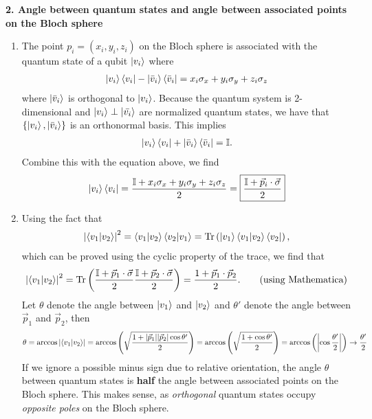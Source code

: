 \documentclass{article}
\theoremstyle{definition}
\newcommand{\f}[2]{\frac{#1}{#2}}
\newcommand{\lp}{\left(}
\newcommand{\rp}{\right)}
\begin{document}
\noindent \textbf{2. Angle between quantum states and angle between associated points on the Bloch sphere} 

\begin{enumerate}[label=(\alph*)]
	\item The point $p_i = (x_i,y_i,z_i)$ on the Bloch sphere is associated with the quantum state of a qubit $\ket{v_i}$ where
	\begin{align*}
		\ket{v_i}\bra{v_i} - \ket{\bar{v}_i} \bra{\bar{v}_i} = x_i \sigma_x + y_i \sigma_y + z_i \sigma_z
	\end{align*}
	where $\ket{\bar{v}_i}$ is orthogonal to $\ket{v_i}$. Because the quantum system is 2-dimensional and $\ket{v_i}\perp \ket{\bar{v_i}}$ are normalized quantum states, we have that $\{ \ket{v_i}, \ket{\bar{v}_i} \}$ is an orthonormal basis. This implies
	\begin{align*}
		\ket{v_i}\bra{v_i} + \ket{\bar{v}_i}\bra{\bar{v}_i} = \mathbb{I}.
	\end{align*}
	Combine this with the equation above, we find
	\begin{align*}
		\ket{v_i} \bra{v_i} = \f{\mathbb{I} + x_i \sigma_x + y_i \sigma_y + z_i \sigma_z }{2} = \boxed{\f{\mathbb{I} + \vec{p}_i\cdot \vec{\sigma}}{2}}
	\end{align*}



	\item Using the fact that
	\begin{align*}
		\abs{\bra{v_1}\ket{v_2}}^2 = \bra{v_1}\ket{v_2} \bra{v_2}\ket{v_1} = \Tr\lp \ket{v_1} \bra{v_1}   \ket{v_2} \bra{v_2}  \rp,
	\end{align*}
	which can be proved using the cyclic property of the trace, we find that
	\begin{align*}
			\abs{\bra{v_1}\ket{v_2}}^2 = \Tr\lp  \f{\mathbb{I} + \vec{p}_1\cdot \vec{\sigma}}{2} \f{\mathbb{I} + \vec{p}_2\cdot \vec{\sigma}}{2}  \rp = \f{1+\vec{p}_1 \cdot \vec{p}_2}{2}. \quad\quad \text{(using Mathematica)}
	\end{align*}
	Let $\theta$ denote the angle between $\ket{v_1}$ and $\ket{v_2}$ and $\theta'$ denote the angle between $\vec{p}_1$ and $\vec{p}_2$, then 
	\begin{align*}
		\theta = \arccos \abs{\bra{v_1}\ket{v_2}} =
		\arccos \lp \sqrt{ \f{1 + \abs{\vec{p}_1}\abs{\vec{p}_2}\cos\theta'}{2} } \rp
		= \arccos \lp \sqrt{ \f{1 + \cos\theta'}{2} } \rp = \arccos \lp \abs{\cos\f{\theta'}{2}} \rp \to \f{\theta'}{2}
	\end{align*}
	If we ignore a possible minus sign due to relative orientation, the angle $\theta$ between quantum states is \textbf{half} the angle between associated points on the Bloch sphere. This makes sense, as \textit{orthogonal} quantum states occupy \textit{opposite poles} on the Bloch sphere. \\
	

\end{enumerate}
\end{document}
